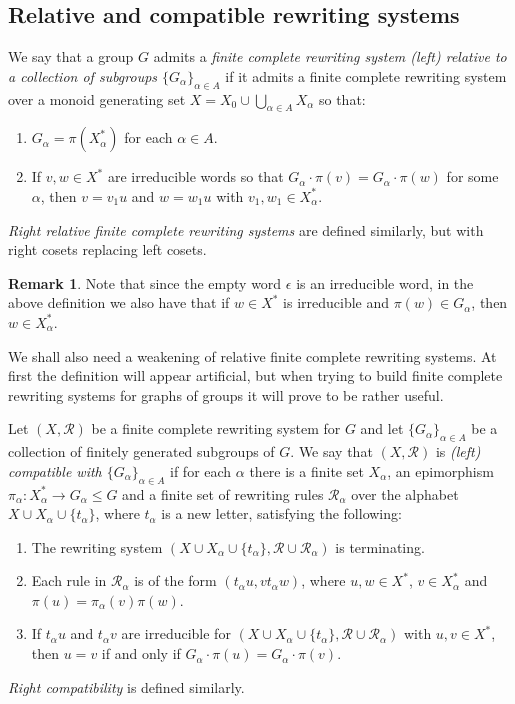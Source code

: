 \documentclass[12pt, a4paper]{amsart}
\theoremstyle{definition}
\newtheorem{remark}[theorem]{Remark}
\begin{document}
\subsection{Relative and compatible rewriting systems}

We say that a group $G$ admits a \emph{finite complete rewriting system (left) relative to a collection of subgroups $\{G_{\alpha}\}_{\alpha\in A}$} if it admits a finite complete rewriting system over a monoid generating set $X = X_0\cup \bigcup_{\alpha\in A}X_{\alpha}$ so that:
\begin{enumerate}
\item $G_{\alpha} = \pi(X_{\alpha}^*)$ for each $\alpha\in A$.
\item If $v, w\in X^*$ are irreducible words so that $G_{\alpha}\cdot \pi(v) = G_{\alpha}\cdot \pi(w)$ for some $\alpha$, then $v = v_1u$ and $w = w_1u$ with $v_1, w_1\in X_{\alpha}^*$.
\end{enumerate}
\emph{Right relative finite complete rewriting systems} are defined similarly, but with right cosets replacing left cosets.


\begin{remark}
Note that since the empty word $\epsilon$ is an irreducible word, in the above definition we also have that if $w\in X^*$ is irreducible and $\pi(w)\in G_{\alpha}$, then $w\in X_{\alpha}^*$.
\end{remark}

We shall also need a weakening of relative finite complete rewriting systems. At first the definition will appear artificial, but when trying to build finite complete rewriting systems for graphs of groups it will prove to be rather useful.



Let $(X, \mathcal{R})$ be a finite complete rewriting system for $G$ and let $\{G_{\alpha}\}_{\alpha\in A}$ be a collection of finitely generated subgroups of $G$. We say that $(X, \mathcal{R})$ is \emph{(left) compatible with $\{G_{\alpha}\}_{\alpha\in A}$} if for each $\alpha$ there is a finite set $X_\alpha$, an epimorphism $\pi_\alpha\colon X_\alpha^*\to G_{\alpha}\leqslant G$ and a finite set of rewriting rules $\mathcal{R}_\alpha$ over the alphabet $X\cup X_{\alpha}\cup \{t_{\alpha}\}$, where $t_{\alpha}$ is a new letter, satisfying the following:
\begin{enumerate}
\item The rewriting system $(X\cup X_{\alpha}\cup \{t_{\alpha}\}, \mathcal{R}\cup \mathcal{R}_{\alpha})$ is terminating.
\item Each rule in $\mathcal{R}_\alpha$ is of the form $(t_\alpha u, vt_\alpha w)$, where $u, w\in X^*$, $v\in X^*_\alpha$ and $\pi(u) = \pi_\alpha(v)\pi(w)$.
\item If $t_\alpha u$ and $t_\alpha v$ are irreducible for $(X\cup X_\alpha\cup\{t_\alpha\}, \mathcal{R}\cup \mathcal{R}_\alpha)$ with $u, v\in X^*$, then $u = v$ if and only if $G_{\alpha}\cdot\pi(u) = G_{\alpha}\cdot \pi(v)$.
\end{enumerate}
\emph{Right compatibility} is defined similarly.
\end{document}
